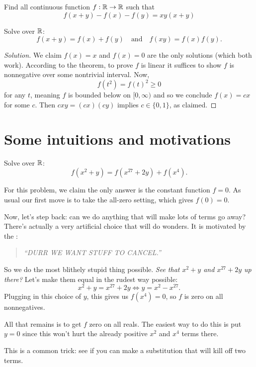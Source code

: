 \begin{example}
Find all continuous function $f: \mathbb R \to \mathbb R$ such that $$f(x+y)-f(x)-f(y)=xy(x+y)$$
\end{example}

\begin{example}
	Solve over $\mathbb R$:
	\[ f(x+y) = f(x) + f(y) \quad\text{and}\quad f(xy) = f(x)f(y). \]
\end{example}
\begin{proof}
	[Solution]
	We claim $f(x) = x$ and $f(x) = 0$ are the only solutions (which both work).
	According to the theorem, to prove $f$ is linear it suffices to show $f$ is nonnegative
	over some nontrivial interval.
	Now, \[ f(t^2) = f(t)^2 \ge 0 \] for any $t$,
	meaning $f$ is bounded below on $[0,\infty)$
	and so we conclude $f(x) = cx$ for some $c$.
	Then $cxy = (cx)(cy)$ implies $c \in \{0,1\}$, as claimed.
\end{proof}

\section{Some intuitions and motivations}
\begin{example}

	Solve over $\mathbb R$: \[ f(x^2+y) = f(x^{27} + 2y) + f(x^4). \]
\end{example}
\begin{soln}
	For this problem, we claim the only answer is the constant function $f=0$.
	As usual our first move is to take the all-zero setting, which gives $f(0) = 0$.

	Now, let's step back: can we do anything that will make lots of terms go away?
	There's actually a very artificial choice that will do wonders.
	It is motivated by the :
	\begin{quote}
		\itshape ``DURR WE WANT STUFF TO CANCEL.''
	\end{quote}
	So we do the most blithely stupid thing possible.
	\emph{See that $x^2+y$ and $x^{27}+2y$ up there?}
	Let's make them equal in the rudest way possible:
	\[ x^2 + y = x^{27} + 2y \iff y = x^2 - x^{27}. \]
	Plugging in this choice of $y$,
	this gives us $f(x^4) = 0$, so $f$ is zero on all nonnegatives.

	All that remains is to get $f$ zero on all reals.
	The easiest way to do this is put $y=0$ since this won't 
	hurt the already positive $x^2$ and $x^4$ terms there.
\end{soln}
This is a common trick: see if you can make a substitution that will kill off two terms.

